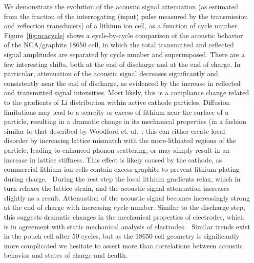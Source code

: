We demonstrate the evolution of the acoustic signal attenuation (as estimated from the fraction of the interrogating (input) pulse measured by the transmission and reflection transducers) of a lithium ion cell, as a function of cycle number. Figure~\ref{fig:ncacycle} shows a cycle-by-cycle comparison of the acoustic behavior of the NCA/graphite 18650 cell, in which the total transmitted and reflected signal amplitudes are separated by cycle number and superimposed. There are a few interesting shifts, both at the end of discharge and at the end of charge. In particular, attenuation of the acoustic signal decreases significantly and consistently near the end of discharge, as evidenced by the increase in reflected and transmitted signal intensities. Most likely, this is a compliance change related to the gradients of Li distribution within active cathode particles. Diffusion limitations may lead to a scarcity or excess of lithium near the surface of a particle, resulting in a dramatic change in its mechanical properties (in a fashion similar to that described by Woodford et. al.~\cite{Woodford2012-fq}; this can either create local disorder by increasing lattice mismatch with the more-lithiated regions of the particle, leading to enhanced phonon scattering, or may simply result in an increase in lattice stiffness. This effect is likely caused by the cathode, as commercial lithium ion cells contain excess graphite to prevent lithium plating during charge.~\cite{linden} During the rest step the local lithium gradients relax, which in turn relaxes the lattice strain, and the acoustic signal attenuation increases slightly as a result. Attenuation of the acoustic signal becomes increasingly strong at the end of charge with increasing cycle number. Similar to the discharge step, this suggests dramatic changes in the mechanical properties of electrodes, which is in agreement with static mechanical analysis of electrodes.~\cite{cannarella_ion,cannarella_stress,Cannarella2014-ej} Similar trends exist in the pouch cell after 50 cycles, but as the 18650 cell geometry is significantly more complicated we hesitate to assert more than correlations between acoustic behavior and states of charge and health.

